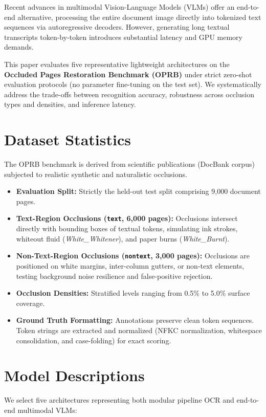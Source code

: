 \documentclass[conference,10pt,a4paper]{IEEEtran}
\begin{document}
Recent advances in multimodal Vision-Language Models (VLMs) offer an end-to-end alternative, processing the entire document image directly into tokenized text sequences via autoregressive decoders. However, generating long textual transcripts token-by-token introduces substantial latency and GPU memory demands. 

This paper evaluates five representative lightweight architectures on the \textbf{Occluded Pages Restoration Benchmark (OPRB)} under strict zero-shot evaluation protocols (no parameter fine-tuning on the test set). We systematically address the trade-offs between recognition accuracy, robustness across occlusion types and densities, and inference latency.

\section{Dataset Statistics}
The OPRB benchmark \cite{oprb2024} is derived from scientific publications (DocBank corpus) subjected to realistic synthetic and naturalistic occlusions. 
\begin{itemize}
    \item \textbf{Evaluation Split:} Strictly the held-out test split comprising 9,000 document pages.
    \item \textbf{Text-Region Occlusions (\texttt{text}, 6,000 pages):} Occlusions intersect directly with bounding boxes of textual tokens, simulating ink strokes, whiteout fluid (\textit{White\_Whitener}), and paper burns (\textit{White\_Burnt}).
    \item \textbf{Non-Text-Region Occlusions (\texttt{nontext}, 3,000 pages):} Occlusions are positioned on white margins, inter-column gutters, or non-text elements, testing background noise resilience and false-positive rejection.
    \item \textbf{Occlusion Densities:} Stratified levels ranging from 0.5\% to 5.0\% surface coverage.
    \item \textbf{Ground Truth Formatting:} Annotations preserve clean token sequences. Token strings are extracted and normalized (NFKC normalization, whitespace consolidation, and case-folding) for exact scoring.
\end{itemize}

\section{Model Descriptions}
We select five architectures representing both modular pipeline OCR and end-to-end multimodal VLMs:
\end{document}

